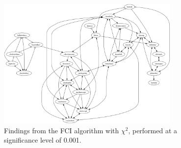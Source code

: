 \begin{figure}[htbp]
    \centering
    \includegraphics[width=0.8\textwidth]{Report/final_report/pictures/FCI_chisq_0.001_all_UA_27_talkmother.png}
    \caption{Findings from the FCI algorithm with $\chi^2$, performed at a significance level of 0.001.}
    \label{fig:fci_chisq_0.001all_UA_27_talkmother}
\end{figure}
